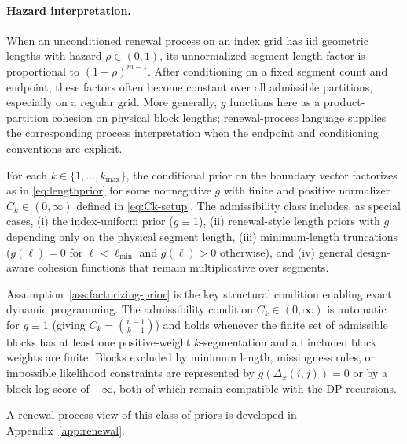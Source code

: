 \paragraph{Hazard interpretation.}
When an unconditioned renewal process on an index grid has iid geometric lengths with hazard
$\rho\in(0,1)$, its unnormalized segment-length factor is proportional to
$(1-\rho)^{m-1}$. After conditioning on a fixed segment count and endpoint, these factors often
become constant over all admissible partitions, especially on a regular grid. More generally, $g$ functions here as a product-partition cohesion on physical block lengths;
renewal-process language supplies the corresponding process interpretation when the endpoint and
conditioning conventions are explicit.

\begin{assumption}
\label{ass:factorizing-prior}
For each $k\in\{1,\dots,k_{\max}\}$, the conditional prior on the boundary vector factorizes as in
\eqref{eq:lengthprior} for some nonnegative $g$ with finite and positive normalizer
$C_k\in(0,\infty)$ defined in \eqref{eq:Ck-setup}. The admissibility class includes, as special
cases, (i) the index-uniform prior ($g\equiv 1$), (ii) renewal-style length priors with $g$
depending only on the physical segment length, (iii) minimum-length truncations
($g(\ell)=0$ for $\ell<\ell_{\min}$ and $g(\ell)>0$ otherwise), and (iv) general design-aware
cohesion functions that remain multiplicative over segments.
\end{assumption}

Assumption~\ref{ass:factorizing-prior} is the key structural condition enabling exact dynamic
programming. The admissibility condition $C_k\in(0,\infty)$ is automatic for $g\equiv 1$ (giving
$C_k=\binom{n-1}{k-1}$) and holds whenever the finite set of admissible blocks has at least one
positive-weight $k$-segmentation and all included block weights are finite. Blocks excluded by
minimum length, missingness rules, or impossible likelihood constraints are represented by
$g(\Delta_x(i,j))=0$ or by a block log-score of $-\infty$, both of which remain compatible with
the DP recursions.

A renewal-process view of this class of priors is developed in Appendix~\ref{app:renewal}.
